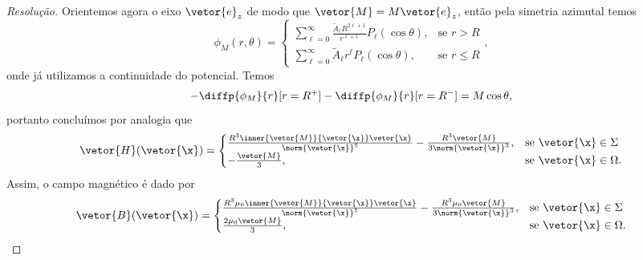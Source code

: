 \begin{proof}[Resolução]
    Orientemos agora o eixo \(\vetor{e}_z\) de modo que \(\vetor{M} = M \vetor{e}_z\), então pela simetria azimutal temos
    \begin{equation*}
        \phi_M(r, \theta) = \begin{cases}
            \sum_{\ell = 0}^\infty \frac{\tilde{A}_\ell R^{2\ell + 1}}{r^{\ell + 1}} P_\ell(\cos\theta),&\text{se }r > R\\
            \sum_{\ell = 0}^\infty \tilde{A}_\ell r^\ell P_\ell (\cos\theta),&\text{se }r \leq R
        \end{cases},
    \end{equation*}
    onde já utilizamos a continuidade do potencial. Temos
    \begin{equation*}
        -\diffp{\phi_M}{r}[r=R^+] - \diffp{\phi_M}{r}[r = R^{-}] = M\cos\theta,
    \end{equation*}
    portanto concluímos por analogia que
    \begin{equation*}
        \vetor{H}(\vetor{\x}) = \begin{cases}
            \frac{R^3\inner{\vetor{M}}{\vetor{\x}}\vetor{\x}}{\norm{\vetor{\x}}^5} - \frac{R^3\vetor{M}}{3 \norm{\vetor{\x}}^3},&\text{se }\vetor{\x} \in \Sigma\\
            - \frac{\vetor{M}}{3},&\text{se }\vetor{\x} \in \Omega.
        \end{cases}
    \end{equation*}
    Assim, o campo magnético é dado por
    \begin{equation*}
        \vetor{B}(\vetor{\x}) = \begin{cases}
            \frac{R^3\mu_0\inner{\vetor{M}}{\vetor{\x}}\vetor{\x}}{\norm{\vetor{\x}}^5} - \frac{R^3\mu_0\vetor{M}}{3 \norm{\vetor{\x}}^3},&\text{se }\vetor{\x} \in \Sigma\\
            \frac{2\mu_0\vetor{M}}{3},&\text{se }\vetor{\x} \in \Omega.
        \end{cases}
    \end{equation*}


\end{proof}
